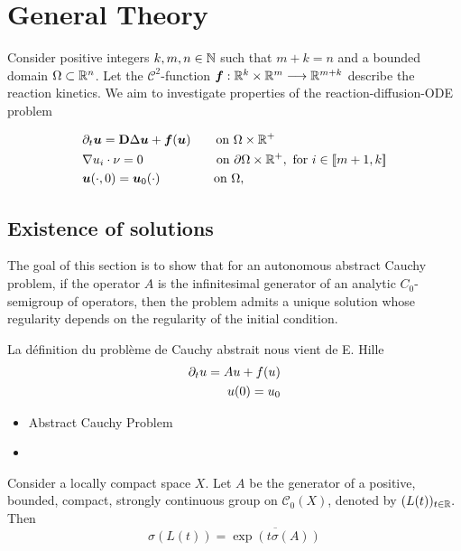 \section{General Theory}

Consider positive integers $k, m, n \in \mathbb{N}$ such that $m+k = n$ and a bounded domain $\Omega \subset \mathbb{R}^{n}$. Let the $\mathcal C^2$-function $\bm f : \mathbb{R}^k \times \mathbb{R}^m \longrightarrow \mathbb{R}^{m+k}$ describe the reaction kinetics. We aim to investigate properties of the reaction-diffusion-ODE problem
 
\begin{align}
	& \partial_t\bm{u}  = \bm{\mathrm D} \Delta \bm{u} + \bm{f}(\bm{u}) \quad\quad \text{on } \Omega \times \mathbb R^{+} \notag \\  &\nabla u_i \cdot \nu = 0 \qquad\qquad\qquad\! \text{on } \partial\Omega \times \mathbb R^{+}, \text{ for } i \in [\![ m+1, k ]\!]\\
	&\bm{u}(\cdot, 0) = \bm{u}_0(\cdot) \qquad\qquad\; \text{on } \Omega, \notag
\end{align}


\subsection{Existence of solutions}

The goal of this section is to show that for an autonomous abstract Cauchy problem, if the operator $A$ is the infinitesimal generator of an analytic $C_0$-semigroup of operators, then the problem admits a unique solution whose regularity depends on the regularity of the initial condition.

\begin{definition} La définition du problème de Cauchy abstrait nous vient de E. Hille 
	\begin{align}
		\partial_t u = Au + f(u) \notag \\
		u(0) = u_0 \notag
	\end{align}
\end{definition}

\begin{itemize}
	\item Abstract Cauchy Problem
	\item 
\end{itemize}


\begin{theorem} 
	Consider a locally compact space $X$. Let $A$ be the generator of a positive, bounded, compact, strongly continuous group on $\mathcal C_0(X)$, denoted by $(L(t))_{t\in\mathbb{R}}.$ Then
	$$\sigma(L(t)) = \overline{\exp(t \sigma(A))}$$
\end{theorem}

